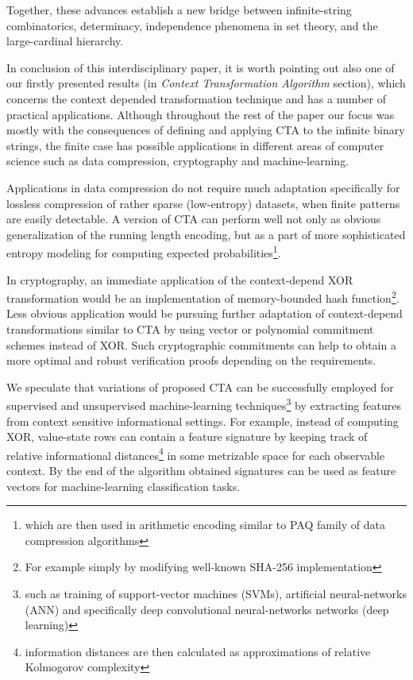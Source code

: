 Together, these advances establish a new bridge between infinite-string combinatorics, determinacy, independence phenomena in set theory, and the large-cardinal hierarchy.  


In conclusion of this interdisciplinary paper, it is worth pointing out also one of our firstly presented results (in \textit{Context Transformation Algorithm} section), which concerns the context depended transformation technique and has a number of practical applications. Although throughout the rest of the paper our focus was mostly with the consequences of defining and applying CTA to the infinite binary strings, the finite case has possible applications in different areas of computer science such as data compression, cryptography and machine-learning.

Applications in data compression do not require much adaptation specifically for lossless compression of rather sparse (low-entropy) datasets, when finite patterns are easily detectable. A version of CTA can perform well not only as obvious generalization of the running length encoding, but as a part of more sophisticated entropy modeling for computing expected probabilities\footnote{which are then used in arithmetic encoding similar to PAQ\cite{Mahoney2005AdaptiveWO} family of data compression algorithms}.

In cryptography, an immediate application of the context-depend XOR transformation would be an implementation of memory-bounded hash function\footnote{For example simply by modifying well-known SHA-256 implementation}. Less obvious application would be pursuing further adaptation of context-depend transformations similar to CTA by using vector or polynomial commitment schemes instead of XOR. Such cryptographic commitments can help to obtain a more optimal and robust verification proofs depending on the requirements.

We speculate that variations of proposed CTA can be successfully employed for supervised and unsupervised machine-learning techniques\footnote{such as training of support-vector machines (SVMs), artificial neural-networks (ANN) and specifically deep convolutional neural-networks networks (deep learning)} by extracting features from context sensitive informational settings. For example, instead of computing XOR, value-state rows can contain a feature signature by keeping track of relative informational distances\footnote{information distances are then calculated as approximations of relative Kolmogorov complexity\cite{li1997introduction}} in some metrizable space for each observable context. By the end of the algorithm obtained signatures can be used as feature vectors for machine-learning classification tasks.
